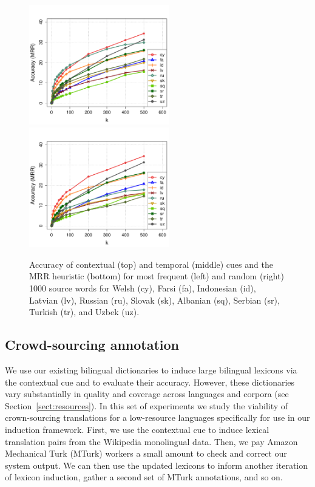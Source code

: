 \documentclass{article}
\newcommand{\secref}[1]{Section~\ref{#1}}
\begin{document}
\begin{figure}[h!]
\centerline{\mbox{\includegraphics[width=2.4in]{figures/exp3/freq/freqmrr} \includegraphics[width=2.4in]{figures/exp3/rand/randmrr}}}
\caption{Accuracy of contextual (top) and temporal (middle) cues and the MRR heuristic (bottom) for most frequent (left) and random (right) 1000 source words for Welsh (cy), Farsi (fa), Indonesian (id), Latvian (lv), Russian (ru), Slovak (sk), Albanian (sq), Serbian (sr), Turkish (tr), and Uzbek (uz).}
\label{fig:exp3}
\end{figure}

\subsection{Crowd-sourcing annotation}

We use our existing bilingual dictionaries to induce large bilingual lexicons via the contextual cue and to evaluate their accuracy.  However, these dictionaries vary substantially in quality and coverage across languages and corpora (see \secref{sect:resources}).  In this set of experiments we study \cite{Irvine:2010} the viability of crown-sourcing translations for a low-resource languages specifically for use in our induction framework.  First, we use the contextual cue to induce lexical translation pairs from the Wikipedia monolingual data. Then, we pay Amazon Mechanical Turk (MTurk) workers a small amount to check and correct our system output. We can then use the updated lexicons to inform another iteration of lexicon induction, gather a second set of MTurk annotations, and so on. \\
\end{document}
